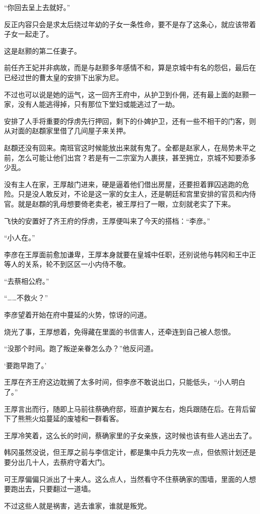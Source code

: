 “你回去呈上去就好。”

反正内容只会是求太后绕过年幼的子女一条性命，要不是存了这条心，就应该带着子女一起走了。

这是赵颢的第二任妻子。

前任齐王妃并非病故，而是与赵颢多年感情不和，算是京城中有名的怨侣，最后在已经过世的曹太皇的安排下出家为尼。

不过也可以说是她的运气，这一回齐王府中，从护卫到仆佣，还有最上面的赵颢一家，没有人能逃得掉，只有那位下堂妇或能逃过了一劫。

安排了人手将重要的俘虏先行押回，剩下的仆婢护卫，还有一些不相干的门客，则从对面的赵頵家里借了几间屋子来关押。

赵頵还没有回来。南班官这时候能放出来就有鬼了。全都是赵家人，在局势未平之前，怎么可能让他们出宫？若是有一二宗室为人裹挟，甚至拥立，京城不知要添多少乱。

没有主人在家，王厚敲门进来，硬是逼着他们借出房屋，还要担着罪囚逃跑的危险。只是没人敢反对，不论是这一家的女主人，还是朝廷和宫里安排的官员和内侍官。就是赵頵的乳母想要倚老卖老，被王厚扫了一眼，立刻就老实了下来。

飞快的安置好了齐王府的俘虏，王厚便叫来了今天的搭档：“李彦。”

“小人在。”

李彦在王厚面前愈加谦卑，王厚本身就要在皇城中任职，还别说他与韩冈和王中正等人的关系，轮不到区区一小内侍不敬。

“去蔡相公府。”

“……不救火？”

李彦望着开始在府中蔓延的火势，惊讶的问道。

烧光了事，王厚想着，免得藏在里面的书信害人，还牵连到自己被人怨恨。

“没那个时间。跑了叛逆亲眷怎么办？”他反问道。

‘要跑早跑了。’

王厚在齐王府这边耽搁了太多时间，但李彦不敢说出口，只能低头，“小人明白了。”

王厚言出而行，随即上马前往蔡确府邸，班直护翼左右，炮兵跟随在后。在背后留下了熊熊火焰蔓延的废墟和一群看客。

王厚冷笑着，这么长的时间，蔡确家里的子女亲族，这时候也该有些人逃出去了。

韩冈虽然没说，但王厚之前与李信定计，都是集中兵力先攻一点，但依照计划还是要分出几十人，去蔡府守着大门。

可王厚偏偏只派出了十来人。这么点人，当然看守不住蔡确家的围墙，里面的人想要跑出去，只要翻过一道墙。

不过这些人就是祸害，逃去谁家，谁就是叛党。

